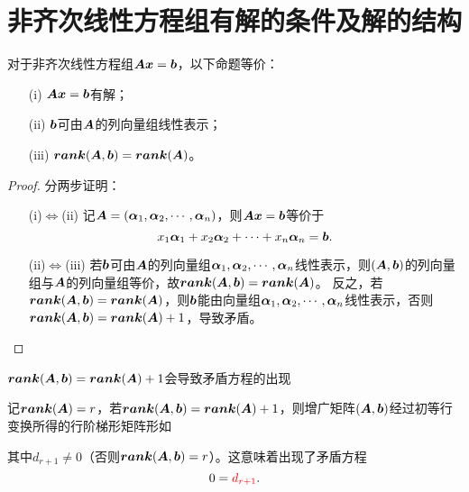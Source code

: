 \section{非齐次线性方程组有解的条件及解的结构}
\begin{frame}
\begin{dingli}
  对于非齐次线性方程组$\MA\vx=\vb$，以下命题等价：
  \begin{itemize}
  \item[(i)] $\MA\vx=\vb$有解；
  \item[(ii)] $\vb$可由$\MA$的列向量组线性表示；
  \item[(iii)] $\rank(\MA,\vb)=\rank(\MA)$。
  \end{itemize}
\end{dingli}
\end{frame}

\begin{frame}
\begin{proof}
  分两步证明：
  \begin{itemize}
  \item[(i)$\Leftrightarrow$(ii)] 记$\MA=(\alphabd_1,\alphabd_2,\cd,\alphabd_n)$，则$\MA\vx=\vb$等价于
    $$
    x_1\alphabd_1+x_2\alphabd_2+\cd+x_n\alphabd_n=\vb.
    $$ \pause 
  \item[(ii)$\Leftrightarrow$(iii)] 若$\vb$可由$\MA$的列向量组$\alphabd_1,\alphabd_2,\cd,\alphabd_n$线性表示，则$(\MA,\vb)$的列向量组与$\MA$的列向量组等价，故$\rank(\MA,\vb)=\rank(\MA)$。    
    反之，若$\rank(\MA,\vb)=\rank(\MA)$，则$\vb$能由向量组$\alphabd_1,\alphabd_2,\cd,\alphabd_n$线性表示，否则$\rank(\MA,\vb)=\rank(\MA)+1$，导致矛盾。
  \end{itemize}
\end{proof}
\end{frame}

\begin{frame}
\begin{zhu}
  $\rank(\MA,\vb)=\rank(\MA)+1$会导致矛盾方程的出现
\end{zhu}
记$\rank(\MA)=r$，若$\rank(\MA,\vb)=\rank(\MA)+1$，则增广矩阵$(\MA,\vb)$经过初等行变换所得的行阶梯形矩阵形如
\begin{center}
\end{center}
其中$d_{r+1}\ne 0$（否则$\rank(\MA,\vb)=r$）。这意味着出现了矛盾方程
$$
0 = \red{d_{r+1}}.
$$    
\end{frame}

